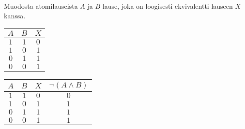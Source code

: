 \begin{tehtava}
     Muodosta atomilauseista $A$ ja $B$ lause, joka on
loogisesti ekvivalentti lauseen $X$ kanssa.

\begin{center}
\begin{tabular}{|c|c|c|}\hline
$A$ & $B$ & $X$\\ \hline
$1$ & $1$ & $0$\\
$1$ & $0$ & $1$\\
$0$ & $1$ & $1$\\
$0$ & $0$ & $1$\\ \hline
\end{tabular}
\end{center}

    \begin{vastaus}
    \begin{center}
\begin{tabular}{|c|c|c|c|}\hline
$A$ & $B$ & $X$ & $\lnot(A\land B)$\\ \hline
$1$ & $1$ & $0$ & $0$\\
$1$ & $0$ & $1$ & $1$\\
$0$ & $1$ & $1$ & $1$\\
$0$ & $0$ & $1$ & $1$\\ \hline
\end{tabular}
\end{center}

    \end{vastaus}
    
\end{tehtava}

